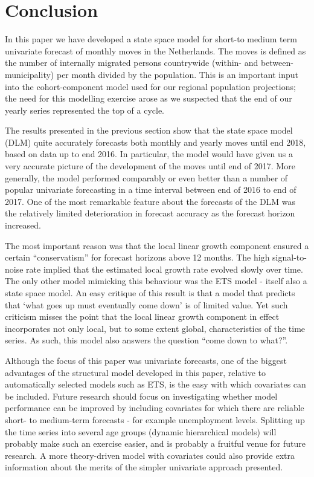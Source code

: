 \documentclass[]{article}
\begin{document}
\section{Conclusion}\label{conclusion}

In this paper we have developed a state space model for short-to medium
term univariate forecast of monthly moves in the Netherlands. The moves
is defined as the number of internally migrated persons countrywide
(within- and between-municipality) per month divided by the population.
This is an important input into the cohort-component model used for our
regional population projections; the need for this modelling exercise
arose as we suspected that the end of our yearly series represented the
top of a cycle.

The results presented in the previous section show that the state space
model (DLM) quite accurately forecasts both monthly and yearly moves
until end 2018, based on data up to end 2016. In particular, the model
would have given us a very accurate picture of the development of the
moves until end of 2017. More generally, the model performed comparably
or even better than a number of popular univariate forecasting in a time
interval between end of 2016 to end of 2017. One of the most remarkable
feature about the forecasts of the DLM was the relatively limited
deterioration in forecast accuracy as the forecast horizon increased.

The most important reason was that the local linear growth component
ensured a certain ``conservatism'' for forecast horizons above 12
months. The high signal-to-noise rate implied that the estimated local
growth rate evolved slowly over time. The only other model mimicking
this behaviour was the ETS model - itself also a state space model. An
easy critique of this result is that a model that predicts that `what
goes up must eventually come down' is of limited value. Yet such
criticism misses the point that the local linear growth component in
effect incorporates not only local, but to some extent global,
characteristics of the time series. As such, this model also answers the
question ``come down to what?''.

Although the focus of this paper was univariate forecasts, one of the
biggest advantages of the structural model developed in this paper,
relative to automatically selected models such as ETS, is the easy with
which covariates can be included. Future research should focus on
investigating whether model performance can be improved by including
covariates for which there are reliable short- to medium-term forecasts
- for example unemployment levels. Splitting up the time series into
several age groups (dynamic hierarchical models) will probably make such
an exercise easier, and is probably a fruitful venue for future
research. A more theory-driven model with covariates could also provide
extra information about the merits of the simpler univariate approach
presented.
\end{document}
